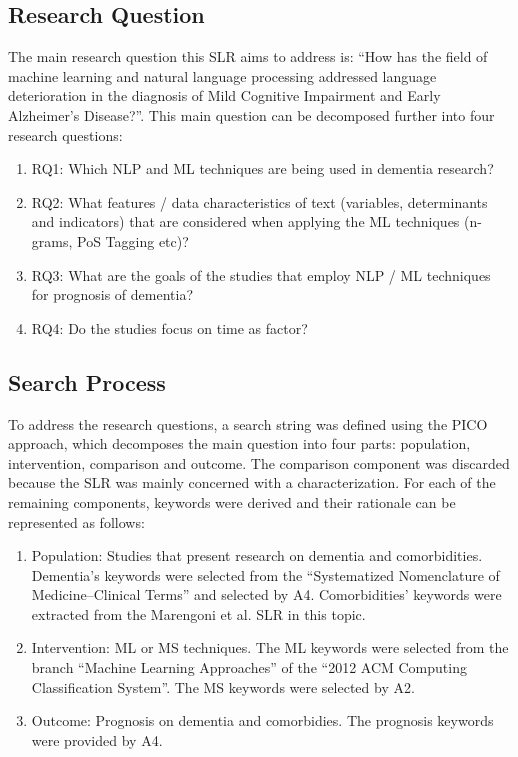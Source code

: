\documentclass[12pt]{article}
\begin{document}
\subsection{Research Question}
The main research question this SLR aims to address is: “How has the field of machine learning and natural language processing addressed language deterioration in the diagnosis of Mild Cognitive Impairment and Early Alzheimer's Disease?”. This main question can be decomposed further into four research questions:
\begin{enumerate}
	\item RQ1: Which NLP and ML techniques are being used in dementia research?
	\item RQ2: What features / data characteristics of text (variables, determinants and indicators) that are considered when applying the ML techniques (n-grams, PoS Tagging etc)?
	\item RQ3: What are the goals of the studies that employ NLP / ML techniques for prognosis of dementia?
	\item RQ4: Do the studies focus on time as factor?
\end{enumerate}

\subsection{Search Process}

To address the research questions, a search string was defined using the PICO approach, which decomposes the main question into four parts: population, intervention, comparison and outcome. The comparison component was discarded because the SLR was mainly concerned with a characterization. For each of the remaining components, keywords were derived and their rationale can be represented as follows:
\begin{enumerate}
	\item Population: Studies that present research on dementia and comorbidities. Dementia’s keywords were selected from the “Systematized Nomenclature of Medicine–Clinical Terms” and selected by A4. Comorbidities’ keywords were extracted from the Marengoni et al. SLR in this topic.
	\item Intervention: ML or MS techniques. The ML keywords were selected from the branch “Machine Learning Approaches” of the “2012 ACM Computing Classification System”. The MS keywords were selected by A2.
	\item Outcome: Prognosis on dementia and comorbidies. The prognosis keywords were provided
by A4.
\end{enumerate}
\end{document}
